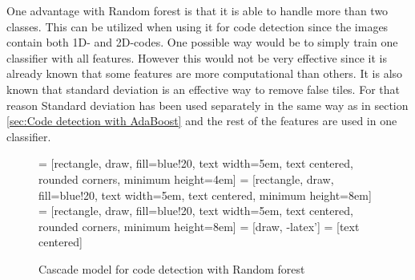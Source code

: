 One advantage with Random forest is that it is able to handle more than two classes. This can be utilized when using it for code detection since the images contain both 1D- and 2D-codes. One possible way would be to simply train one classifier with all features. However this would not be very effective since it is already known that some features are more computational than others. It is also known that standard deviation is an effective way to remove false tiles. For that reason Standard deviation has been used separately in the same way as in section \ref{sec:Code detection with AdaBoost} and the rest of the features are used in one classifier.

\begin{figure}[H]
\centering
{} = [rectangle, draw, fill=blue!20, 
    text width=5em, text centered, rounded corners, minimum height=4em]
 = [rectangle, draw, fill=blue!20, 
    text width=5em, text centered, minimum height=8em]
 = [rectangle, draw, fill=blue!20, 
    text width=5em, text centered, rounded corners, minimum height=8em]
 = [draw, -latex']
 = [text centered]

\caption{Cascade model for code detection with Random forest}
\label{Cascade3}
\end{figure}

